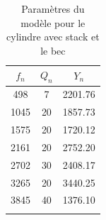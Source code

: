 \documentclass[atiam, article]{rapport} %
\begin{document}
\begin{table}[H]
    \centering
    \begin{tabular}{ccc}
\toprule
$f_n$ & $Q_n$ & $Y_n$ \\ \midrule
498 & 7 & 2201.76 \\
1045 & 20 & 1857.73 \\
1575 & 20 & 1720.12 \\
2161 & 20 & 2752.20 \\
2702 & 30 & 2408.17 \\
3265 & 20 & 3440.25 \\
3845 & 40 & 1376.10 \\
\bottomrule\\
    \end{tabular}
    \caption{Paramètres du modèle pour le cylindre avec stack et le bec}
    \label{tab:param_cylindre+stack+bec}
\end{table}
\end{document}
